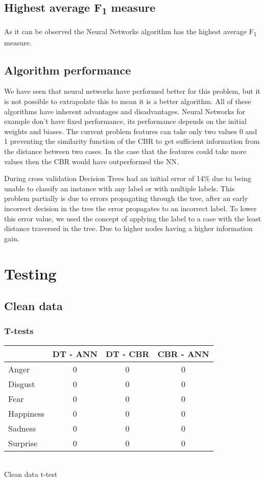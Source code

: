 \documentclass[a4paper,11pt]{article}
\begin{document}
\subsection{Highest average F\textsubscript{1} measure}
As it can be observed the Neural Networks algorithm has the highest average F\textsubscript{1} measure. 

\subsection{Algorithm performance}
We have seen that neural networks have performed better for this problem, but
it is not possible to extrapolate this to mean it is a better algorithm. All of
these algorithms have inherent advantages and disadvantages. Neural Networks
for example don't have fixed performance, its performance depends on the
initial weights and biases. The current problem features can take only two
values 0 and 1 preventing the similarity function of the CBR to get
sufficient information from the distance between two cases. In the case
that the features could take more values then the CBR would have outperformed the NN.

During cross validation Decision Trees had an initial error of 14\% due to
being unable to classify an instance with any label or with multiple
labels. This problem partially is due to errors propagating through the
tree, after an early incorrect decision in the tree the error propagates to
an incorrect label. To lower this error value, we used the concept of
applying the label to a case with the least distance traversed in the tree.
Due to higher nodes having a higher information gain.

\section{Testing}

\subsection{Clean data}

\subsubsection{T-tests}

    \begin{center}
    \begin{tabular}{|l ||c|c|c|} \hline
    & DT - ANN & DT - CBR & CBR - ANN\\ \hline \hline
    Anger & 0 & 0 & 0 \\ \hline
    Disgust & 0 & 0 & 0 \\ \hline
    Fear & 0 & 0 & 0 \\ \hline
    Happiness & 0 & 0 & 0 \\ \hline
    Sadness & 0 & 0 & 0 \\ \hline
    Surprise & 0 & 0 & 0 \\ \hline
    \end{tabular}\vspace{5pt}\\
    Clean data t-test
    \end{center}
\end{document}
